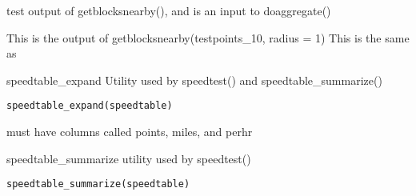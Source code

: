 \documentclass[a4paper]{book}
\begin{document}
%
\begin{SeeAlso}\relax
{}    
\end{SeeAlso}
%
\begin{Description}\relax
test output of getblocksnearby(), and is an input to doaggregate()
\end{Description}
%
\begin{Details}\relax
This is the output of getblocksnearby(testpoints\_10, radius = 1)
This is the same as  
\end{Details}
%
\begin{SeeAlso}\relax
{}    
\end{SeeAlso}
%
\begin{Description}\relax
speedtable\_expand
Utility used by speedtest() and speedtable\_summarize()
\end{Description}
%
\begin{Usage}
\begin{verbatim}
speedtable_expand(speedtable)
\end{verbatim}
\end{Usage}
%
\begin{Arguments}
\begin{ldescription}
\item[\code{speedtable}] must have columns called  points, miles, and perhr
\end{ldescription}
\end{Arguments}
%
\begin{Description}\relax
speedtable\_summarize
utility used by speedtest()
\end{Description}
%
\begin{Usage}
\begin{verbatim}
speedtable_summarize(speedtable)
\end{verbatim}
\end{Usage}
\end{document}
